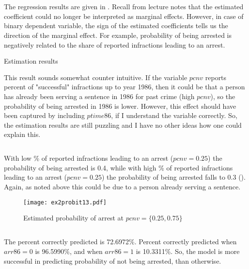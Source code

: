 \documentclass[]{article}
\begin{document}
\section{}
\subsection{}
The regression results are given in . Recall from lecture notes that the estimated coefficient could no longer be interpreted as marginal effects. However, in case of binary dependent variable, the sign of the estimated coefficients tells us the direction of the marginal effect. For example, probability of being arrested is negatively related to the share of reported infractions leading to an arrest.
\begin{table}[h]
	\centering
	
	\caption{Estimation results}
	\label{tab:ex2estmar}
\end{table}
This result sounds somewhat counter intuitive. If the variable $pcnv$ reports percent of "successful" infractions up to year 1986, then it could be that a person has already been serving a sentence in 1986 for past crime (high $pcnv$), so the probability of being arrested in 1986 is lower. However, this effect should have been captured by including $ptime86$, if I understand the variable correctly. So, the estimation results are still puzzling and I have no other ideas how one could explain this.

\subsection{}
With low \% of reported infractions leading to an arrest ($pcnv = 0.25$) the probability of being arrested is 0.4, while with high \% of reported infractions leading to an arrest ($pcnv = 0.25$) the probability of being arrested falls to 0.3 (). Again, as noted above this could be due to a person already serving a sentence.
\begin{figure}[h]
	\centering
	\texttt{[image: ex2probit13.pdf]}
	\caption{Estimated probability of arrest at $pcnv = \{0.25, 0.75\}$}
	\label{fig:ex2predp}
\end{figure}

\subsection{}
The percent correctly predicted is 72.6972\%. Percent correctly predicted when $arr86 = 0$ is 96.5990\%, and when $arr86 = 1$ is 10.3311\%. So, the model is more successful in predicting probability of not being arrested, than otherwise.
\end{document}
